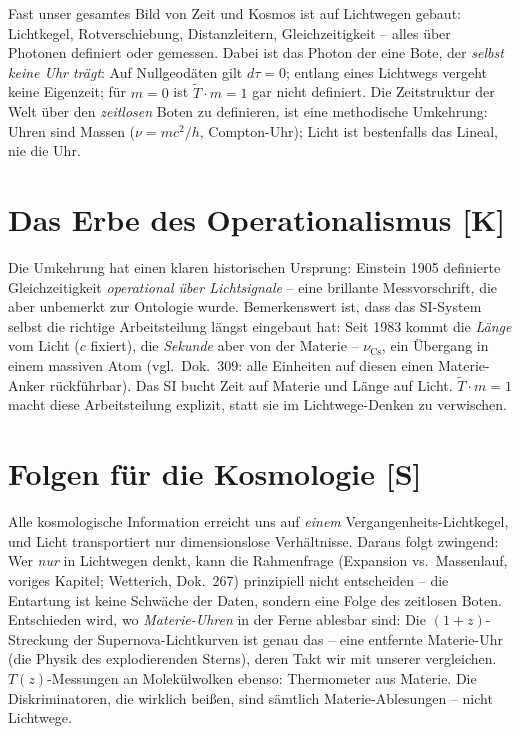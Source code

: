 Fast unser gesamtes Bild von Zeit und Kosmos ist auf Lichtwegen
gebaut: Lichtkegel, Rotverschiebung, Distanzleitern,
Gleichzeitigkeit -- alles über Photonen definiert oder gemessen.
Dabei ist das Photon der eine Bote, der \emph{selbst keine Uhr
trägt}: Auf Nullgeodäten gilt $d\tau = 0$; entlang eines Lichtwegs
vergeht keine Eigenzeit; für $m = 0$ ist $\tilde T \cdot m = 1$
gar nicht definiert. Die Zeitstruktur der Welt über den
\emph{zeitlosen} Boten zu definieren, ist eine methodische
Umkehrung: Uhren sind Massen ($\nu = mc^2/h$, Compton-Uhr); Licht
ist bestenfalls das Lineal, nie die Uhr.

\section{Das Erbe des Operationalismus [K]}

Die Umkehrung hat einen klaren historischen Ursprung: Einstein 1905
definierte Gleichzeitigkeit \emph{operational über
Lichtsignale} -- eine brillante Messvorschrift, die aber
unbemerkt zur Ontologie wurde. Bemerkenswert ist, dass das
SI-System selbst die richtige Arbeitsteilung längst eingebaut hat:
Seit 1983 kommt die \emph{Länge} vom Licht ($c$ fixiert), die
\emph{Sekunde} aber von der Materie -- $\nu_\text{Cs}$, ein
Übergang in einem massiven Atom (vgl.\ Dok.~309: alle Einheiten
auf diesen einen Materie-Anker rückführbar). Das SI bucht Zeit auf
Materie und Länge auf Licht. $\tilde T \cdot m = 1$ macht diese
Arbeitsteilung explizit, statt sie im Lichtwege-Denken zu
verwischen.

\section{Folgen für die Kosmologie [S]}

Alle kosmologische Information erreicht uns auf \emph{einem}
Vergangenheits-Lichtkegel, und Licht transportiert nur
dimensionslose Verhältnisse. Daraus folgt zwingend: Wer
\emph{nur} in Lichtwegen denkt, kann die Rahmenfrage (Expansion
vs.\ Massenlauf, voriges Kapitel; Wetterich, Dok.~267) prinzipiell
nicht entscheiden -- die Entartung ist keine Schwäche der Daten,
sondern eine Folge des zeitlosen Boten. Entschieden wird, wo
\emph{Materie-Uhren} in der Ferne ablesbar sind: Die
$(1+z)$-Streckung der Supernova-Lichtkurven ist genau das -- eine
entfernte Materie-Uhr (die Physik des explodierenden Sterns), deren
Takt wir mit unserer vergleichen. $T(z)$-Messungen an
Molekülwolken ebenso: Thermometer aus Materie. Die
Diskriminatoren, die wirklich beißen, sind sämtlich
Materie-Ablesungen -- nicht Lichtwege.

